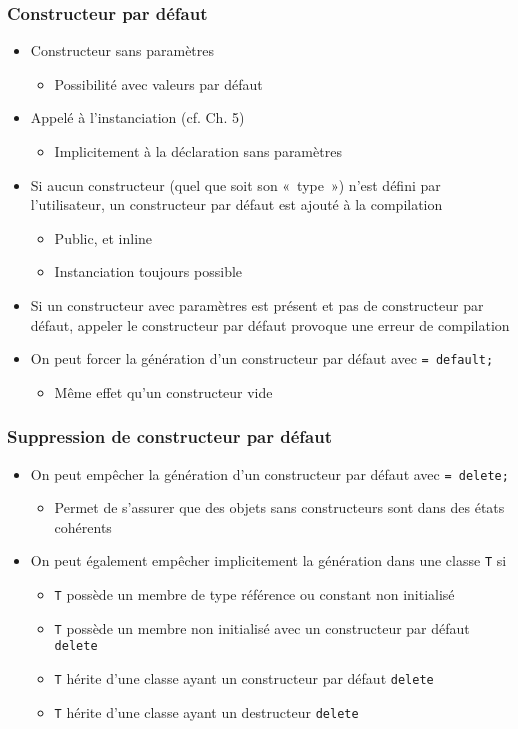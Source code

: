 \begin{frame}
\frametitle{Constructeur par défaut}
\begin{itemize}[<+->]
\item Constructeur sans paramètres
	\begin{itemize}
	\item Possibilité avec valeurs par défaut
	\end{itemize}
\item Appelé à l'instanciation (cf. Ch. 5)
	\begin{itemize}
	\item Implicitement à la déclaration sans paramètres
	\end{itemize}
\item Si aucun constructeur (quel que soit son «~type~») n'est défini par l'utilisateur, un constructeur par défaut est ajouté à la compilation
	\begin{itemize}
	\item Public, et inline
	\item Instanciation toujours possible
	\end{itemize}
\item Si un constructeur avec paramètres est présent et pas de constructeur par défaut, appeler le constructeur par défaut provoque une erreur de compilation
\item On peut forcer la génération d'un constructeur par défaut avec \lstinline|= default;|
	\begin{itemize}
	\item Même effet qu'un constructeur vide
	\end{itemize}
\end{itemize}
\end{frame}

\begin{frame}
\frametitle{Suppression de constructeur par défaut}
\begin{itemize}[<+->]
\item On peut empêcher la génération d'un constructeur par défaut avec \lstinline|= delete;|
	\begin{itemize}
	\item Permet de s'assurer que des objets sans constructeurs sont dans des états cohérents
	\end{itemize}
\item On peut également empêcher implicitement la génération dans une classe \texttt{T} si
	\begin{itemize}
	\item \texttt{T} possède un membre de type référence ou constant non initialisé
	\item \texttt{T} possède un membre non initialisé  avec un constructeur par défaut \lstinline|delete|
	\item \texttt{T} hérite d'une classe ayant un constructeur par défaut \lstinline|delete|
	\item \texttt{T} hérite d'une classe ayant un destructeur \lstinline|delete|
	\end{itemize}
\end{itemize}
\end{frame}

